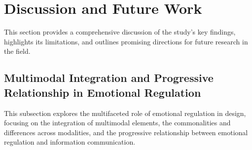 \section{Discussion and Future Work} 
This section provides a comprehensive discussion of the study’s key findings, highlights its limitations, and outlines promising directions for future research in the field.

\subsection{Multimodal Integration and Progressive Relationship in Emotional Regulation} %
This subsection explores the multifaceted role of emotional regulation in design, focusing on the integration of multimodal elements, the commonalities and differences across modalities, and the progressive relationship between emotional regulation and information communication.

